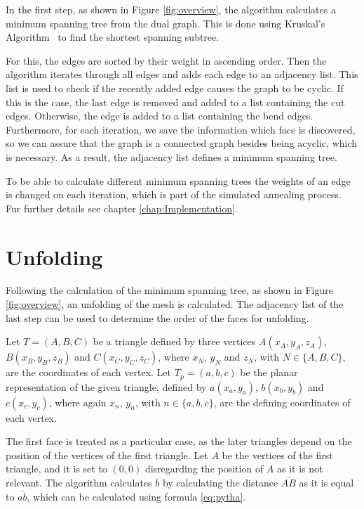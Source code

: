 \documentclass[draft,final]{vutinfth} %
\begin{document}
In the first step, as shown in Figure \ref{fig:overview}, the algorithm calculates a minimum spanning tree from the dual graph. This is done using Kruskal's Algorithm~\cite{kruskal1956shortest} to find the shortest spanning subtree.

For this, the edges are sorted by their weight in ascending order. Then the algorithm iterates through all edges and adds each edge to an adjacency list. This list is used to check if the recently added edge causes the graph to be cyclic. If this is the case, the last edge is removed and added to a list containing the cut edges. Otherwise, the edge is added to a list containing the bend edges. Furthermore, for each iteration, we save the information which face is discovered, so we can assure that the graph is a connected graph besides being acyclic, which is necessary. As a result, the adjacency list defines a minimum spanning tree.

To be able to calculate different minimum spanning trees the weights of an edge is changed on each iteration, which is part of the simulated annealing process. Fur further details see chapter \ref{chap:Implementation}.

\section{Unfolding}
\label{sec:unfold}
Following the calculation of the minimum spanning tree, as shown in Figure \ref{fig:overview}, an unfolding of the mesh is calculated. The adjacency list of the last step can be used to determine the order of the faces for unfolding.

Let $T = (A,B,C)$ be a triangle defined by three vertices $A(x_A, y_A, z_A)$, $B(x_B, y_B, z_B)$ and $C(x_C, y_C, z_C)$, where $x_N$, $y_N$ and $z_N$, with $N \in \{A,B,C\}$, are the coordinates of each vertex. Let $T_p = (a, b, c)$ be the planar representation of the given triangle, defined by $a(x_a, y_a)$, $b(x_b, y_b)$ and $c(x_c, y_c)$, where again $x_n$, $y_n$, with $n \in \{a,b,c\}$, are the defining coordinates of each vertex.

The first face is treated as a particular case, as the later triangles depend on the position of the vertices of the first triangle. Let $A$ be the vertices of the first triangle, and it is set to $(0,0)$ disregarding the position of $A$ as it is not relevant. The algorithm calculates $b$ by calculating the distance $\overline{AB}$ as it is equal to $\overline{ab}$, which can be calculated using formula \ref{eq:pytha}.
\end{document}
